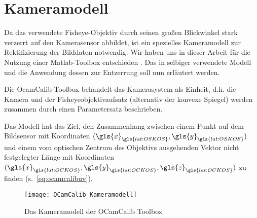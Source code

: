 \section{Kameramodell} \label{sec:kameramodell}
Da das verwendete Fisheye-Objektiv durch seinen großen Blickwinkel stark verzerrt auf den Kamerasensor abbildet, ist ein spezielles Kameramodell zur Rektifizierung der Bilddaten notwendig. Wir haben uns in dieser Arbeit für die Nutzung einer Matlab-Toolbox entschieden  \autocite{OCamCalibOmnidirectionalCamera, scaramuzzaFlexibleTechniqueAccurate2006, scaramuzzaToolboxEasilyCalibrating2006, scaramuzzaOmnidirectionalVisionCalibration2007, rufliAutomaticDetectionCheckerboards2008}. Das in selbiger verwendete Modell und die Anwendung dessen zur Entzerrung soll nun erläutert werden. 

Die OcamCalib-Toolbox behandelt das Kamerasystem als Einheit, d.h. die Kamera und der Fisheyeobjektivaufsatz (alternativ der konvexe Spiegel) werden zusammen durch einen Parametersatz beschrieben.

Das Modell hat das Ziel, den Zusammenhang zwischen einem Punkt auf dem Bildsensor  mit Koordinaten \((\gls{x}_{\gls{lat:OSKOS}}, \gls{y}_{\gls{lat:OSKOS}})\) und einem vom optischen Zentrum des Objektivs ausgehenden Vektor nicht festgelegter Länge  mit Koordinaten \((\gls{x}_{\gls{lat:OCKOS}}, \gls{y}_{\gls{lat:OCKOS}}, \gls{z}_{\gls{lat:OCKOS}})\) zu finden (s.~\eqref{eq:ocamcalibuv}).

\begin{figure}[H]
  \centering
  \texttt{[image: OCamCalib\_Kameramodell]}
  \caption{Das Kameramodell der OCamCalib Toolbox}
  \label{fig:kameramodell}
\end{figure}

